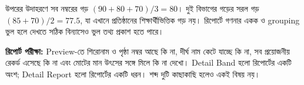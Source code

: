 উপরের উদাহরণে সব নম্বরের গড় $(90+80+70)/3=80$। দুই বিভাগের গড়ের সরল গড় $(85+70)/2=77.5$, যা এখানে প্রতিষ্ঠানের শিক্ষার্থীভিত্তিক গড় নয়। রিপোর্টে গণনার একক ও grouping ভুল হলে দেখতে সঠিক বিন্যাসেও ভুল তথ্য প্রকাশ হতে পারে।

\textbf{রিপোর্ট পরীক্ষা:} Preview-তে শিরোনাম ও পৃষ্ঠা নম্বর আছে কি না, দীর্ঘ নাম কেটে যাচ্ছে কি না, সব প্রয়োজনীয় রেকর্ড এসেছে কি না এবং মোটের মান উৎসের সঙ্গে মিলে কি না দেখো। Detail Band হলো রিপোর্টের একটি অংশ; Detail Report হলো রিপোর্টের একটি ধরন। শব্দ দুটি কাছাকাছি হলেও একই বিষয় নয়।


